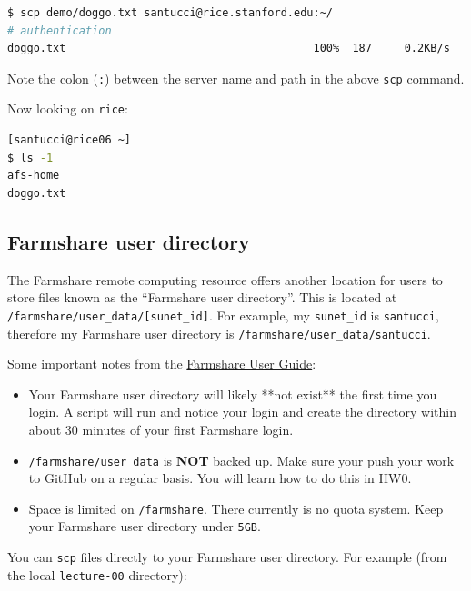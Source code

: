 \documentclass[12pt,letterpaper,twoside]{article}
\begin{document}
\begin{lstlisting}[language=bash]
$ scp demo/doggo.txt santucci@rice.stanford.edu:~/
# authentication
doggo.txt                                      100%  187     0.2KB/s   00:00
\end{lstlisting}

Note the colon (\texttt{:}) between the server name and path in the above \texttt{scp}
command.

Now looking on \texttt{rice}:

\begin{lstlisting}[language=bash]
[santucci@rice06 ~]
$ ls -1
afs-home
doggo.txt
\end{lstlisting}

\subsection{Farmshare user directory}

The Farmshare remote computing resource offers another location for users to
store files known as the ``Farmshare user directory''.  This is located at
\texttt{/farmshare/user\_data/[sunet\_id]}.  For example, my \texttt{sunet\_id} is \texttt{santucci},
therefore my Farmshare user directory is \newline 
\texttt{/farmshare/user\_data/santucci}.

Some important notes from the \href{https://web.stanford.edu/group/farmshare/cgi-bin/wiki/index.php/User_Guide}{Farmshare User Guide}:

\begin{itemize}
\item  Your Farmshare user directory will likely **not exist** the first time you
login.  A script will run and notice your login and create the directory within
about 30 minutes of your first Farmshare login.

\item  \texttt{/farmshare/user\_data} is \textbf{NOT} backed up.  Make sure your push your work to
GitHub on a regular basis.  You will learn how to do this in HW0.

\item  Space is limited on \texttt{/farmshare}.  There currently is no quota system.  Keep
your Farmshare user directory under \texttt{5GB}.
\end{itemize}

You can \texttt{scp} files directly to your Farmshare user directory.  For example
(from the local \texttt{lecture-00} directory):
\end{document}

